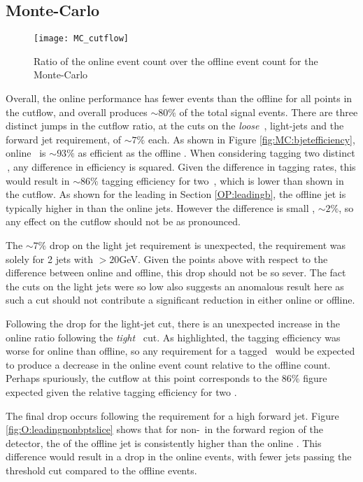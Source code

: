 	\subsection{Monte-Carlo}
		\begin{figure}[h]
			\centering
			\texttt{[image: MC\_cutflow]}
			\caption[\VBFHBB\ Cutflow ratio for Monte-Carlo simulation]{Ratio of the online event count over the offline event count for the Monte-Carlo}
			\label{f:cutflowMC}
		\end{figure}

	Overall, the online performance has fewer events than the offline for all points in the cutflow, and overall produces $\sim80\%$ of the total signal events. There are three distinct jumps in the cutflow ratio, at the cuts on the \textit{loose} \bjets\,, light-jets and the forward jet requirement, of $\sim7\%$ each. As shown in Figure \ref{fig:MC:bjetefficiency}, online \btag\, is $\sim93\%$ as efficient as the offline \btag. When considering tagging two distinct \bjets\,, any difference in efficiency is squared. Given the difference in tagging rates, this would result in $\sim86\%$ tagging efficiency for two \bjets\,, which is lower than shown in the cutflow. As shown for the leading \bjet in Section \ref{OP:leadingb}, the offline jet is typically higher in \pt than the online jets. However the difference is small , $\sim2\%$, so any effect on the cutflow should not be as pronounced.

	The $\sim7\%$ drop on the light jet requirement is unexpected, the requirement was solely for 2 jets with \pt$>20$GeV. Given the points above with respect to the \pt difference between online and offline, this drop should not be so sever. The fact the \pt cuts on the light jets were so low also suggests an anomalous result here as such a cut should not contribute a significant reduction in either online or offline.

	Following the drop for the light-jet cut, there is an unexpected increase in the online ratio following the \textit{tight} \btagging\, cut. As highlighted, the tagging efficiency was worse for online than offline, so any requirement for a tagged \bjet\, would be expected to produce a decrease in the online event count relative to the offline count. Perhaps spuriously, the cutflow at this point corresponds to the $86\%$ figure expected given the relative tagging efficiency for two \bjets.

	The final drop occurs following the requirement for a high \pt forward jet. Figure \ref{fig:O:leadingnonbptslice} shows that for non-\bjets\, in the forward region of the detector, the \pt of the offline jet is consistently higher than the online \pt. This difference would result in a drop in the online events, with fewer jets passing the threshold \pt cut compared to the offline events.

